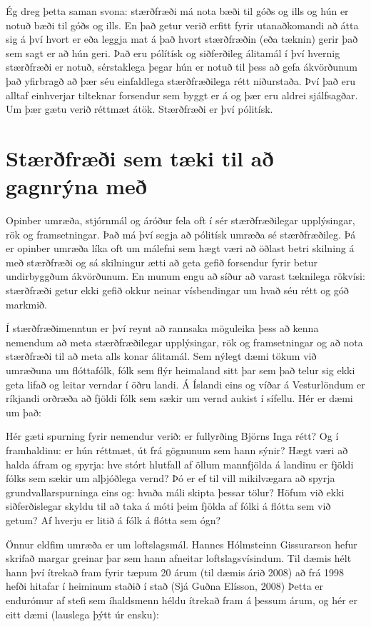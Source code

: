 \documentclass[
  icelandic,
]{book}
\begin{document}
Ég dreg þetta saman svona: stærðfræði má nota bæði til góðs og ills og hún er notuð bæði til góðs og ills. En það getur verið erfitt fyrir utanaðkomandi að átta sig á því hvort er eða leggja mat á það hvort stærðfræðin (eða tæknin) gerir það sem sagt er að hún geri. Það eru pólítísk og siðferðileg álitamál í því hvernig stærðfræði er notuð, sérstaklega þegar hún er notuð til þess að gefa ákvörðunum það yfirbragð að þær séu einfaldlega stærðfræðilega rétt niðurstaða. Því það eru alltaf einhverjar tilteknar forsendur sem byggt er á og þær eru aldrei sjálfsagðar. Um þær gætu verið réttmæt átök. Stærðfræði er því pólitísk.

\section{Stærðfræði sem tæki til að gagnrýna með}\label{stae_taeki_ryni}

Opinber umræða, stjórnmál og áróður fela oft í sér stærðfræðilegar upplýsingar, rök og framsetningar. Það má því segja að pólitísk umræða sé stærðfræðileg. Þá er opinber umræða líka oft um málefni sem hægt væri að öðlast betri skilning á með stærðfræði og sá skilningur ætti að geta gefið forsendur fyrir betur undirbyggðum ákvörðunum. En munum engu að síður að varast tæknilega rökvísi: stærðfræði getur ekki gefið okkur neinar vísbendingar um hvað séu rétt og góð markmið.

Í stærðfræðimenntun er því reynt að rannsaka möguleika þess að kenna nemendum að meta stærðfræðilegar upplýsingar, rök og framsetningar og að nota stærðfræði til að meta alls konar álitamál. Sem nýlegt dæmi tökum við umræðuna um flóttafólk, fólk sem flýr heimaland sitt þar sem það telur sig ekki geta lifað og leitar verndar í öðru landi. Á Íslandi eins og víðar á Vesturlöndum er ríkjandi orðræða að fjöldi fólk sem sækir um vernd aukist í sífellu. Hér er dæmi um það:

Hér gæti spurning fyrir nemendur verið: er fullyrðing Björns Inga rétt? Og í framhaldinu: er hún réttmæt, út frá gögnunum sem hann sýnir? Hægt væri að halda áfram og spyrja: hve stórt hlutfall af öllum mannfjölda á landinu er fjöldi fólks sem sækir um alþjóðlega vernd? Þó er ef til vill mikilvægara að spyrja grundvallarspurninga eins og: hvaða máli skipta þessar tölur? Höfum við ekki siðferðislegar skyldu til að taka á móti þeim fjölda af fólki á flótta sem við getum? Af hverju er litið á fólk á flótta sem ógn?

Önnur eldfim umræða er um loftslagsmál. Hannes Hólmsteinn Gissurarson hefur skrifað margar greinar þar sem hann afneitar loftslagsvísindum. Til dæmis hélt hann því ítrekað fram fyrir tæpum 20 árum (til dæmis árið 2008) að frá 1998 hefði hitafar í heiminum staðið í stað (Sjá Guðna Elísson, 2008) Þetta er endurómur af stefi sem íhaldsmenn héldu ítrekað fram á þessum árum, og hér er eitt dæmi (lauslega þýtt úr ensku):
\end{document}
